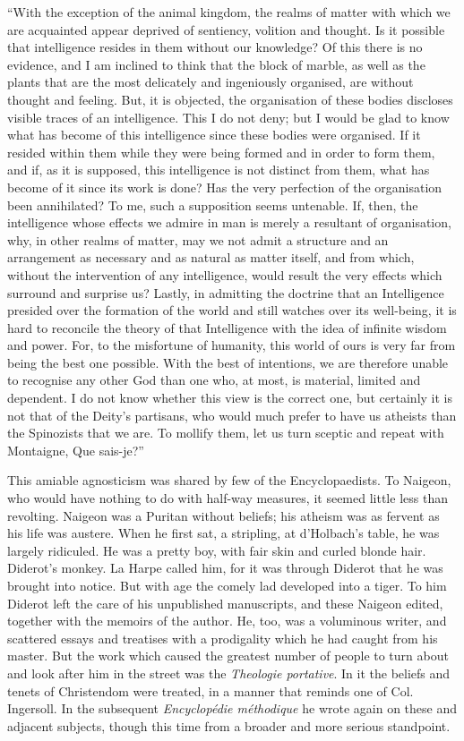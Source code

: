 \documentclass[]{book}
\begin{document}
``With the exception of the animal kingdom, the realms of matter with
which we are acquainted appear deprived of sentiency, volition and
thought. Is it possible that intelligence resides in them without our
knowledge? Of this there is no evidence, and I am inclined to think that
the block of marble, as well as the plants that are the most delicately
and ingeniously organised, are without thought and feeling. But, it is
objected, the organisation of these bodies discloses visible traces of
an intelligence. This I do not deny; but I would be glad to know what
has become of this intelligence since these bodies were organised. If it
resided within them while they were being formed and in order to form
them, and if, as it is supposed, this intelligence is not distinct from
them, what has become of it since its work is done? Has the very
perfection of the organisation been annihilated? To me, such a
supposition seems untenable. If, then, the intelligence whose effects we
admire in man is merely a resultant of organisation, why, in other
realms of matter, may we not admit a structure and an arrangement as
necessary and as natural as matter itself, and from which, without the
intervention of any intelligence, would result the very effects which
surround and surprise us? Lastly, in admitting the doctrine that an
Intelligence presided over the formation of the world and still watches
over its well-being, it is hard to reconcile the theory of that
Intelligence with the idea of infinite wisdom and power. For, to the
misfortune of humanity, this world of ours is very far from being the
best one possible. With the best of intentions, we are therefore unable
to recognise any other God than one who, at most, is material, limited
and dependent. I do not know whether this view is the correct one, but
certainly it is not that of the Deity's partisans, who would much prefer
to have us atheists than the Spinozists that we are. To mollify them,
let us turn sceptic and repeat with Montaigne, Que sais-je?''

This amiable agnosticism was shared by few of the Encyclopaedists. To
Naigeon, who would have nothing to do with half-way measures, it seemed
little less than revolting. Naigeon was a Puritan without beliefs; his
atheism was as fervent as his life was austere. When he first sat, a
stripling, at d'Holbach's table, he was largely ridiculed. He was a
pretty boy, with fair skin and curled blonde hair. Diderot's monkey. La
Harpe called him, for it was through Diderot that he was brought into
notice. But with age the comely lad developed into a tiger. To him
Diderot left the care of his unpublished manuscripts, and these Naigeon
edited, together with the memoirs of the author. He, too, was a
voluminous writer, and scattered essays and treatises with a prodigality
which he had caught from his master. But the work which caused the
greatest number of people to turn about and look after him in the street
was the \emph{Theologie portative}. In it the beliefs and tenets of
Christendom were treated, in a manner that reminds one of Col.
Ingersoll. In the subsequent \emph{Encyclopédie méthodique} he wrote
again on these and adjacent subjects, though this time from a broader
and more serious standpoint.
\end{document}
